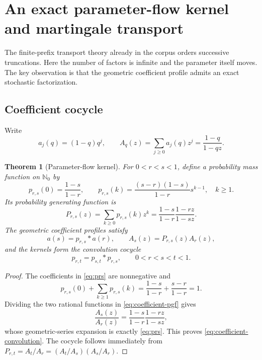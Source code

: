 \documentclass[11pt,a4paper]{article}
\newtheorem{theorem}{Theorem}[section]
\theoremstyle{definition}
\newcommand{\N}{\mathbb{N}}
\newcommand{\1}{\mathbf{1}}
\begin{document}
\section{An exact parameter-flow kernel and martingale transport}
\label{sec:transport}

The finite-prefix transport theory already in the corpus orders successive
truncations.  Here the number of factors is infinite and the parameter itself
moves.  The key observation is that the geometric coefficient profile admits
an exact stochastic factorization.

\subsection{Coefficient cocycle}

Write
\begin{equation}
 a_j(q)=(1-q)q^j,
 \qquad
 A_q(z)=\sum_{j\ge0}a_j(q)z^j=\frac{1-q}{1-qz}.
 \label{eq:coefficient-pgf}
\end{equation}

\begin{theorem}[Parameter-flow kernel]
\label{thm:kernel}
For $0<r<s<1$, define a probability mass function on $\N_0$ by
\begin{equation}
 p_{r,s}(0)=\frac{1-s}{1-r},\qquad
 p_{r,s}(k)=\frac{(s-r)(1-s)}{1-r}s^{k-1},\quad k\ge1.
 \label{eq:prs}
\end{equation}
Its probability generating function is
\begin{equation}
 P_{r,s}(z)=\sum_{k\ge0}p_{r,s}(k)z^k
 =\frac{1-s}{1-r}\frac{1-rz}{1-sz}.
 \label{eq:Prs}
\end{equation}
The geometric coefficient profiles satisfy
\begin{equation}
 a(s)=p_{r,s}*a(r),
 \qquad A_s(z)=P_{r,s}(z)A_r(z),
 \label{eq:coefficient-convolution}
\end{equation}
and the kernels form the convolution cocycle
\begin{equation}
 p_{r,t}=p_{s,t}*p_{r,s},
 \qquad 0<r<s<t<1.
 \label{eq:cocycle}
\end{equation}
\end{theorem}

\begin{proof}
The coefficients in \eqref{eq:prs} are nonnegative and
\[
 p_{r,s}(0)+\sum_{k\ge1}p_{r,s}(k)
 =\frac{1-s}{1-r}+\frac{s-r}{1-r}=1.
\]
Dividing the two rational functions in \eqref{eq:coefficient-pgf} gives
\[
 \frac{A_s(z)}{A_r(z)}
 =\frac{1-s}{1-r}\frac{1-rz}{1-sz},
\]
whose geometric-series expansion is exactly \eqref{eq:prs}.  This proves
\eqref{eq:coefficient-convolution}.  The cocycle follows immediately from
$P_{r,t}=A_t/A_r=(A_t/A_s)(A_s/A_r)$.
\end{proof}
\end{document}
